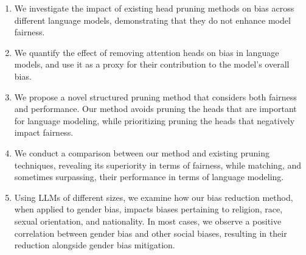\documentclass[letterpaper]{article} %
\newcommand{\goncalo}[1]
{\textcolor{orange}{{\bf}{\em #1}{\bf}}}
\begin{document}
\begin{enumerate}

\item We investigate the impact of existing head pruning methods on bias across different language models, demonstrating that they do not enhance model fairness.
\item We quantify the effect of removing attention heads on bias in language models, and use it as a proxy for their contribution to the model's overall bias.

\item We propose a novel structured pruning method that considers both fairness and performance. Our method avoids pruning the heads that are important for language modeling, while prioritizing pruning the heads that negatively impact fairness.
\item We conduct a comparison between our method and existing pruning techniques, revealing its superiority in terms of fairness, while %
matching, and sometimes surpassing, their performance in terms of language modeling.


 \item Using LLMs of different sizes, we examine how our bias reduction method, when applied to gender bias, impacts biases pertaining to religion, race, sexual orientation, and nationality. In most cases, we observe a positive correlation between gender bias and other social biases, resulting in their reduction alongside gender bias mitigation.




\end{enumerate}
\end{document}
